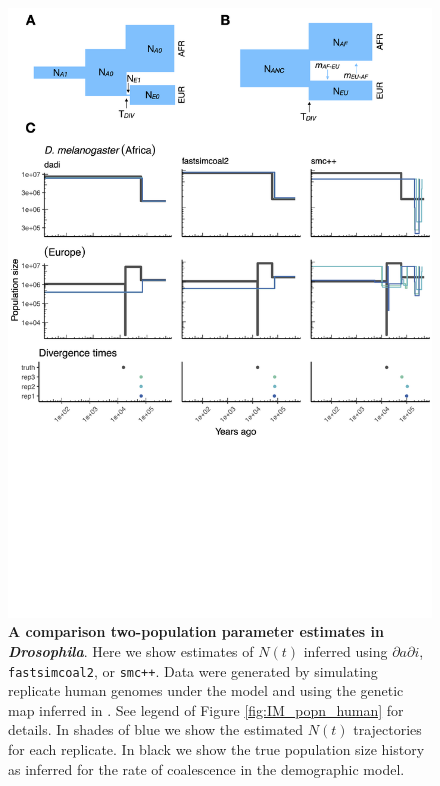\documentclass[12pt,halfline,a4paper]{ouparticle}
\newcommand{\stopsupplement}{%
        \setcounter{table}{0}
        \renewcommand{\thetable}{\arabic{table}}%
        \setcounter{figure}{0}
        \renewcommand{\thefigure}{\arabic{figure}}%
     }
\newcommand{\dadi}{$\partial a \partial i$\xspace}
\newcommand{\smcpp}{\texttt{smc++}\xspace}
\begin{document}
\begin{figure}
\begin{center}
\includegraphics[width=0.8\linewidth]{display_items/d_mel_two_popn_comp.png}
\caption{\textbf{A comparison two-population parameter estimates in \emph{Drosophila}}. Here we show estimates of $N(t)$ inferred using \dadi, \texttt{fastsimcoal2}, or \smcpp.
Data were generated by simulating
replicate human genomes under the \cite{li2006inferring} model and using the genetic map
inferred in \cite{comeron2012many}. See legend of Figure \ref{fig:IM_popn_human} for details.
In shades of blue we show the estimated
$N(t)$ trajectories for each replicate. In black we show the true population size history as inferred
for the rate of coalescence in the demographic model.}
\label{fig:two_popn_fly}
\end{center}
\end{figure}

\stopsupplement
\end{document}
